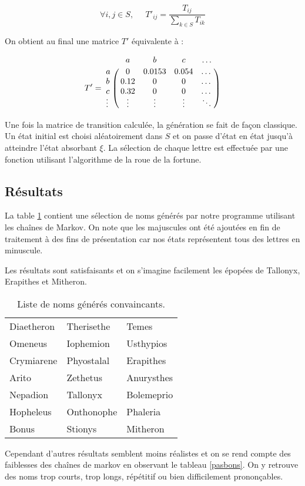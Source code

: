 \documentclass[12pt]{article}
\begin{document}
$$
\forall i, j \in S,\;\;\;\;\; {T'}_{ij} = \frac{T_{ij}}{\sum_{k \in S} T_{ik}}
$$
\vspace{0.5cm}

On obtient au final une matrice $T'$ équivalente à :

$$
T' = \bordermatrix{
    & a & b & c & \dots \cr
  a & 0 & 0.0153 & 0.054 & \dots \cr
  b & 0.12 & 0 & 0 & \dots \cr
  c & 0.32 & 0 & 0 & \dots \cr
  \vdots & \vdots & \vdots & \vdots & \ddots \cr
}
$$
\vspace{0.5cm}

Une fois la matrice de transition calculée, la génération se fait de
façon classique. Un état initial est choisi aléatoirement dans $S$ et
on passe d'état en état jusqu'à atteindre l'état absorbant $\xi$. La
sélection de chaque lettre est effectuée par une fonction utilisant
l'algorithme de la roue de la fortune.

\subsection{Résultats}

La table \ref{bons} contient une sélection de noms générés par notre
programme utilisant les chaînes de Markov. On note que les majuscules
ont été ajoutées en fin de traitement à des fins de présentation car
nos états représentent tous des lettres en minuscule.

Les résultats sont satisfaisants et on s'imagine facilement les
épopées de Tallonyx, Erapithes et Mitheron.

\begin{table}[H]
  \centering

  \begin{tabular}{l|l|l}
    Diaetheron & Therisethe & Temes \\
    Omeneus & Iophemion & Usthypios \\
    Crymiarene & Phyostalal & Erapithes \\
    Arito & Zethetus & Anurysthes \\
    Nepadion & Tallonyx & Bolemeprio \\
    Hopheleus & Onthonophe & Phaleria \\
    Bonus & Stionys & Mitheron
  \end{tabular}

  \caption{Liste de noms générés convaincants.}
  \label{bons}

\end{table}

Cependant d'autres résultats semblent moins réalistes et on se rend
compte des faiblesses des chaînes de markov en observant le tableau
\ref{pasbons}. On y retrouve des noms trop courts, trop longs,
répétitif ou bien difficilement prononçables.
\end{document}
